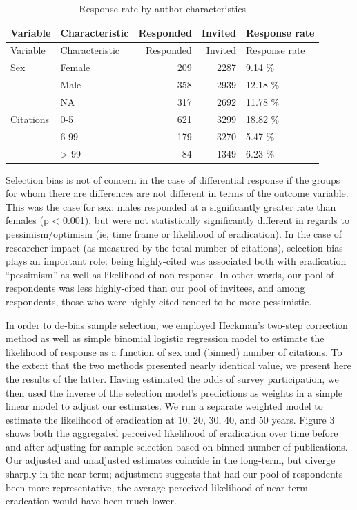 \documentclass[]{article}
\begin{document}
\begin{longtable}[]{@{}llrrl@{}}
\caption{Response rate by author characteristics}\tabularnewline
\toprule
Variable & Characteristic & Responded & Invited & Response
rate\tabularnewline
\midrule
\endfirsthead
\toprule
Variable & Characteristic & Responded & Invited & Response
rate\tabularnewline
\midrule
\endhead
Sex & Female & 209 & 2287 & 9.14 \%\tabularnewline
& Male & 358 & 2939 & 12.18 \%\tabularnewline
& NA & 317 & 2692 & 11.78 \%\tabularnewline
Citations & 0-5 & 621 & 3299 & 18.82 \%\tabularnewline
& 6-99 & 179 & 3270 & 5.47 \%\tabularnewline
& \textgreater{} 99 & 84 & 1349 & 6.23 \%\tabularnewline
\bottomrule
\end{longtable}

Selection bias is not of concern in the case of differential response if
the groups for whom there are differences are not different in terms of
the outcome variable. This was the case for sex: males responded at a
significantly greater rate than females (p \textless{} 0.001), but were
not statistically significantly different in regards to
pessimism/optimism (ie, time frame or likelihood of eradication). In the
case of researcher impact (as measured by the total number of
citations), selection bias plays an important role: being highly-cited
was associated both with eradication ``pessimism'' as well as likelihood
of non-response. In other words, our pool of respondents was less
highly-cited than our pool of invitees, and among respondents, those who
were highly-cited tended to be more pessimistic.

In order to de-bias sample selection, we employed Heckman's two-step
correction method as well as simple binomial logistic regression model
to estimate the likelihood of response as a function of sex and (binned)
number of citations. To the extent that the two methods presented nearly
identical value, we present here the results of the latter. Having
estimated the odds of survey participation, we then used the inverse of
the selection model's predictions as weights in a simple linear model to
adjust our estimates. We run a separate weighted model to estimate the
likelihood of eradication at 10, 20, 30, 40, and 50 years. Figure 3
shows both the aggregated perceived likelihood of eradication over time
before and after adjusting for sample selection based on binned number
of publications. Our adjusted and unadjusted estimates coincide in the
long-term, but diverge sharply in the near-term; adjustment suggests
that had our pool of respondents been more representative, the average
perceived likelihood of near-term eradcation would have been much lower.
\end{document}
